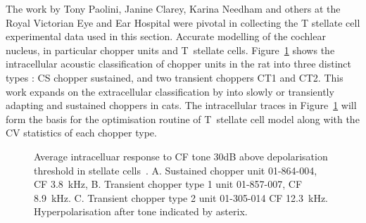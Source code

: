 

The work by Tony Paolini, Janine Clarey, Karina Needham and others at the Royal Victorian Eye and Ear Hospital were pivotal in collecting the T stellate cell experimental data used in this section.
Accurate modelling of the cochlear nucleus, in particular chopper units and T~stellate cells.
Figure~\ref{fig:PaoliniAIV} shows the intracellular acoustic classification of chopper units in the rat into three distinct types \citep{PaoliniClareyEtAl:2005}: CS chopper sustained, and two transient choppers CT1 and CT2.
This work expands on the extracellular classification by \citep{BlackburnSachs:1989} into slowly or transiently adapting and sustained choppers in cats.
The intracellular traces in Figure~\ref{fig:PaoliniAIV} will form the basis for the optimisation routine of T~stellate cell model along with the CV statistics of each chopper type.


\begin{figure}[htb]
  \centering
{}\hfill%
\hfill%
\caption[Average intracelluar response data in stellate cells in rats.]{Average intracelluar response to CF tone 30dB above depolarisation threshold in stellate  cells~\citep[Reproduced~from~][]{PaoliniClareyEtAl:2005}.
A. Sustained chopper unit 01-864-004, CF 3.8~kHz,
B. Transient chopper type 1 unit 01-857-007, CF 8.9~kHz.
C. Transient chopper type 2 unit 01-305-014 CF 12.3~kHz.
Hyperpolarisation after tone indicated by asterix.  \label{fig:PaoliniAIV}}
\end{figure}

